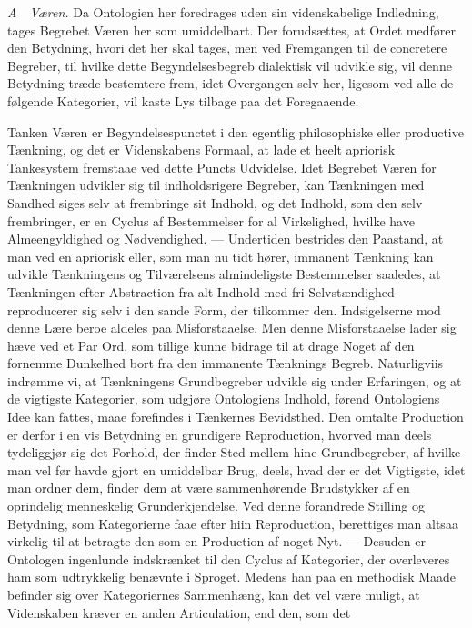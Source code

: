 \documentclass[12pt]{article}
\newcommand{\opage}[1]{\marginnote{\footnotesize\textit{[#1]}}}
\begin{document}
\emph{A}~~\emph{Væren.} Da Ontologien her foredrages uden sin videnskabelige
Indledning, tages Begrebet Væren her som umiddelbart. Der forudsættes, at Ordet
medfører den Betydning, hvori det her skal tages, men ved Fremgangen til de
concretere Begreber, til hvilke dette Begyndelsesbegreb dialektisk vil udvikle
sig, vil \opage{208}denne Betydning træde bestemtere frem, idet Overgangen selv
her, ligesom ved alle de følgende Kategorier, vil kaste Lys tilbage paa det
Foregaaende.

Tanken Væren er Begyndelsespunctet i den egentlig philosophiske eller productive
Tænkning, og det er Videnskabens Formaal, at lade et heelt apriorisk Tankesystem
fremstaae ved dette Puncts Udvidelse. Idet Begrebet Væren for Tænkningen udvikler
sig til indholdsrigere Begreber, kan Tænkningen med Sandhed siges selv at
frembringe sit Indhold, og det Indhold, som den selv frembringer, er en Cyclus af
Bestemmelser for al Virkelighed, hvilke have Almeengyldighed og Nødvendighed. ---
Undertiden bestrides den Paastand, at man ved en apriorisk eller, som man nu tidt
hører, immanent Tænkning kan udvikle Tænkningens og Tilværelsens almindeligste
Bestemmelser saaledes, at Tænkningen efter Abstraction fra alt Indhold med fri
Selvstændighed reproducerer sig selv i den sande Form, der tilkommer den.
Indsigelserne mod denne Lære beroe aldeles paa Misforstaaelse. Men denne
Misforstaaelse lader sig hæve ved et Par Ord, som tillige kunne bidrage til at
drage Noget af den fornemme Dunkelhed bort fra den immanente Tænknings Begreb.
Naturligviis indrømme vi, at Tænkningens Grundbegreber udvikle sig under
Erfaringen, og at de vigtigste Kategorier, som udgjøre Ontologiens Indhold,
førend Ontologiens Idee kan fattes, maae forefindes i Tænkernes Bevidsthed. Den
omtalte Production er derfor i en vis Betydning en grundigere Reproduction,
hvorved man deels tydeliggjør sig det Forhold, der finder Sted mellem hine
Grundbegreber, af hvilke man vel før havde gjort en umiddelbar Brug, deels, hvad
der er det Vigtigste, idet man ordner dem, finder dem at være sammenhørende
Brudstykker af en oprindelig menneskelig Grunderkjendelse. Ved denne forandrede
Stilling og Betydning, som Kategorierne faae efter hiin Reproduction, berettiges
man altsaa virkelig til at betragte den som en \opage{209}Production af noget
Nyt. --- Desuden er Ontologen ingenlunde indskrænket til den Cyclus af
Kategorier, der overleveres ham som udtrykkelig benævnte i Sproget. Medens han
paa en methodisk Maade befinder sig over Kategoriernes Sammenhæng, kan det vel
være muligt, at Videnskaben kræver en anden Articulation, end den, som det
\end{document}

